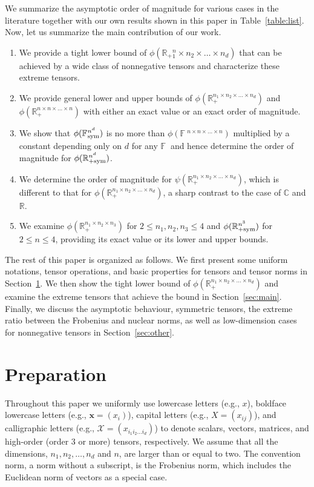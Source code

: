 \documentclass[11pt]{article}
\newcommand{\BB}{\mathbb{B}}
\newcommand{\C}{\mathbb{C}}
\newcommand{\R}{\mathbb{R}}
\newcommand{\BF}{\mathbb{F}\:\!}
\newcommand{\X}{\mathcal{X}}
\newcommand{\bx}{\boldsymbol{x}}
\newcommand{\sym}{\textnormal{sym}}
\begin{document}
We summarize the asymptotic order of magnitude for various cases in the literature together with our own results shown in this paper in Table~\ref{table:list}. Now, let us summarize the main contribution of our work.
\begin{enumerate}
    \item We provide a tight lower bound of $\phi(\R_+{^n_1\times n_2\times\dots\times n_d})$ that can be achieved by a wide class of nonnegative tensors and characterize these extreme tensors.
    \item We provide general lower and upper bounds of $\phi(\R_+^{n_1\times n_2\times\dots\times n_d})$ and $\phi(\R_+^{n\times n\times\dots\times n})$ with either an exact value or an exact order of magnitude.
    \item We show that $\phi(\BF^{n^d}_\sym)$ is no more than $\phi(\BF^{n\times n\times \dots\times n})$ multiplied by a constant depending only on $d$ for any $\BF$ and hence determine the order of magnitude for $\phi(\R^{n^d}_{+\sym})$.
    \item We determine the order of magnitude for $\psi(\R_+^{n_1\times n_2\times \dots \times n_d})$, which is different to that for $\phi(\R_+^{n_1\times n_2\times \dots \times n_d})$, a sharp contrast to the case of $\C$ and $\R$.
    \item We examine $\phi(\R_+^{n_1\times n_2\times n_3})$ for $2\le n_1,n_2,n_3\le 4$ and $\phi(\R^{n^3}_{+\sym})$ for $2\le n\le 4$, providing its exact value or its lower and upper bounds.
\end{enumerate}

The rest of this paper is organized as follows. We first present some uniform notations, tensor operations, and basic properties for tensors and tensor norms in Section~\ref{sec:notation}. We then show the tight lower bound of $\phi(\R_+^{n_1\times n_2\times\dots\times n_d})$ and examine the extreme tensors that achieve the bound in Section~\ref{sec:main}. Finally, we discuss the asymptotic behaviour, symmetric tensors, the extreme ratio between the Frobenius and nuclear norms, as well as low-dimension cases for nonnegative tensors in Section~\ref{sec:other}.


\section{Preparation}\label{sec:notation}

Throughout this paper we uniformly use lowercase letters (e.g., $x$), boldface lowercase letters (e.g., $\bx=\left(x_i\right)$), capital letters (e.g., $X=\left(x_{ij}\right)$), and calligraphic letters (e.g., $\X=\left(x_{i_1i_2\dots i_d}\right)$) to denote scalars, vectors, matrices, and high-order (order $3$ or more) tensors, respectively. We assume that all the dimensions, $n_1,n_2,\dots,n_d$ and $n$, are larger than or equal to two. The convention norm, a norm without a subscript, is the Frobenius norm, which includes the Euclidean norm of vectors as a special case. %
\end{document}
